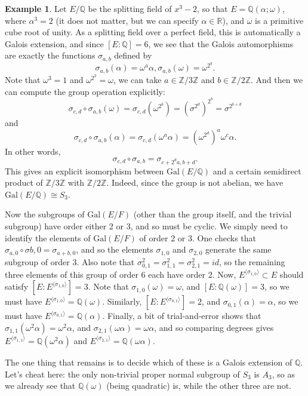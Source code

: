 \documentclass[12pt]{report}
\theoremstyle{definition}
\newtheorem{example}[theorem]{Example}
\newcommand{\Gal}{\text{Gal}}
\newcommand{\ZZ}{\mathbb{Z}}
\newcommand{\QQ}{\mathbb{Q}}
\newcommand{\RR}{\mathbb{R}}
\begin{document}
\begin{example}
	Let $E/\QQ$ be the splitting field of $x^3 - 2$, so that $E = \QQ(\alpha; \omega)$, where $\alpha^3 = 2$ (it does not matter, but we can specify $\alpha\in \RR$), and $\omega$ is a primitive cube root of unity. As a splitting field over a perfect field, this is automatically a Galois extension, and since $[E :\QQ] = 6$, we see that the Galois automorphisms are exactly the functions $\sigma_{a,b}$ defined by $$\sigma_{a,b}(\alpha)=\omega^a \alpha, \sigma_{a,b}(\omega)=\omega^{2^b}.$$
	Note that $\omega^3=1$ and $\omega^{2^2}=\omega$, we can take $a\in\ZZ/3\ZZ$ and $b\in\ZZ/2\ZZ$. And then we can compute the group operation explicitly: $$\sigma_{c,d}\circ\sigma_{a,b}(\omega)=\sigma_{c,d}(\omega^{2^b}) = (\sigma^{2^d})^{2^b} = \sigma^{2^{b+d}}$$
	and $$\sigma_{c,d}\circ\sigma_{a,b}(\alpha)= \sigma_{c,d}(\omega^a \alpha) = (\omega^{2^d})^a \omega^c\alpha.$$
	In other words, $$\sigma_{c,d}\circ\sigma_{a,b}=\sigma_{c+2^da,b+d}.$$
	This gives an explicit isomorphism between $\Gal(E/\QQ)$ and a certain semidirect product of $\ZZ/3\ZZ$ with $\ZZ/2\ZZ$. Indeed, since the group is not abelian, we have $\Gal(E/\QQ)\cong S_3$.

	Now the subgroups of $\Gal(E/F)$ (other than the group itself, and the trivial subgroup) have order either 2 or 3, and so must be cyclic. We simply need to identify the elements of $\Gal(E/F)$ of order 2 or 3. One checks that $\sigma_{a,0}\circ\sigma{b,0} = \sigma_{a+b,0}$, and so the elements $\sigma_{1,0}$ and $\sigma_{2,0}$ generate the same subgroup of order 3. Also note that $\sigma_{0,1}^2 = \sigma_{1,1}^2 = \sigma_{2,1}^2 = id$, so the remaining three elements of this group of order 6 each have order 2. Now, $E^{\langle \sigma_{1,0}\rangle} \subset E$ should satisfy $[E : E^{\langle \sigma_{1,0}\rangle}] = 3$. Note that $\sigma_{1,0}(\omega) = \omega$, and $[E : \QQ(\omega)] = 3$, so we must have $E^{\langle \sigma_{1,0}\rangle} = \QQ(\omega)$. Similarly, $[E : E^{\langle \sigma_{0,1}\rangle}] = 2$, and $\sigma_{0,1}(\alpha) = \alpha$, so we must have $E^{\langle \sigma_{0,1}\rangle} = \QQ(\alpha)$. Finally, a bit of trial-and-error shows that $\sigma_{1,1}(\omega^2\alpha) = \omega^2\alpha$, and $\sigma_{2,1}(\omega\alpha) = \omega\alpha$, and so comparing degrees gives $E^{\langle \sigma_{1,1}\rangle} = \QQ(\omega^2\alpha)$ and $E^{\langle \sigma_{2,1}\rangle} = \QQ(\omega\alpha)$.

	The one thing that remains is to decide which of these is a Galois extension of $\QQ$. Let's cheat here: the only non-trivial proper normal subgroup of $S_3$ is $A_3$, so as we already see that $\QQ(\omega)$ (being quadratic) is, while the other three are not.
\end{example}
\end{document}
